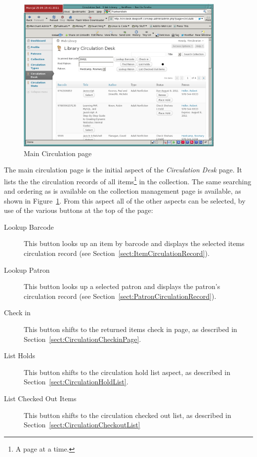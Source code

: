 \documentclass[letterpaper,twoside]{article}
\begin{document}
\begin{figure}[htbp]
\begin{centering}
\includegraphics[width=4in]{MainCirculation.png}
\caption{Main Circulation page}
\label{fig:MainCirculation}
\end{centering}
\end{figure}
The main circulation page is the initial aspect of the \textit{Circulation
Desk} page. It lists the the circulation records of all
items\footnote{A page at a time.} in the collection.  The same searching
and ordering as is available on the collection management page is
available, as shown in Figure~\ref{fig:MainCirculation}.  From this aspect
all of the other aspects can be selected, by use of the various buttons
at the top of the page:
\begin{description}
\item[Lookup Barcode] This button looks up an item by barcode and
displays the selected items circulation record (see
Section~\ref{sect:ItemCirculationRecord}).
\item[Lookup Patron] This button looks up a selected patron and displays
the patron's circulation record (see
Section~\ref{sect:PatronCirculationRecord}). 
\item[Check in] This button shifts to the returned items check in page,
as described in Section~\ref{sect:CirculationCheckinPage}.
\item[List Holds] This button shifts to the circulation hold list
aspect, as described in Section~\ref{sect:CirculationHoldList}.
\item[List Checked Out Items] This button shifts to the circulation
checked out list, as described in Section~\ref{sect:CirculationCheckoutList}
\end{description}
\end{document}
